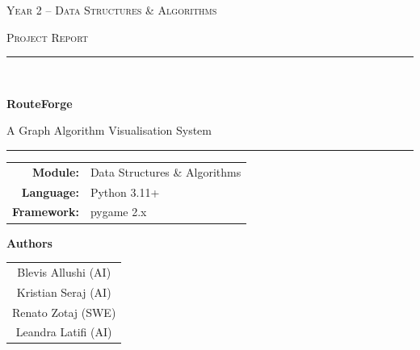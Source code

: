 \documentclass[12pt, a4paper]{article}
\begin{document}

\begin{titlepage}
    \centering
    \vspace*{2cm}

    {\Large\textsc{Year 2 -- Data Structures \& Algorithms}\par}
    \vspace{0.4cm}
    {\large\textsc{Project Report}\par}

    \vspace{1.5cm}
    \rule{\linewidth}{1pt}\\[0.6em]
    {\Huge\bfseries RouteForge\par}
    \vspace{0.3em}
    {\Large A Graph Algorithm Visualisation System\par}
    \rule{\linewidth}{1pt}

    \vspace{2cm}

    \begin{tabular}{rl}
        \textbf{Module:}     & Data Structures \& Algorithms \\[4pt]
        \textbf{Language:}   & Python 3.11+                  \\[4pt]
        \textbf{Framework:}  & pygame 2.x                    \\[4pt]
    \end{tabular}

    \vspace{1.8cm}

    {\large\textbf{Authors}\par}
    \vspace{0.4cm}
    \begin{tabular}{c}
        Blevis Allushi (AI) \\[3pt]
        Kristian Seraj (AI)\\[3pt]
        Renato Zotaj   (SWE)\\[3pt]
        Leandra Latifi (AI)\\
    \end{tabular}

    \vfill
\end{titlepage}

\tableofcontents
\newpage

\end{document}
